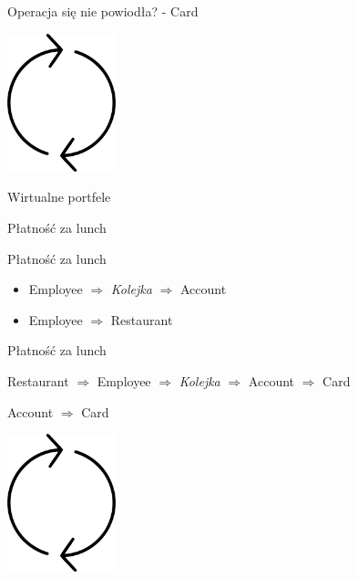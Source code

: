 \documentclass{beamer}
\begin{document}
\begin{frame}{Operacja się nie powiodła? - Card}
	\begin{center}
		\includegraphics[height=4cm]{cykl1.png}
	\end{center}
\end{frame}

\begin{frame}{Wirtualne portfele}
	\begin{center}
		\Huge{Płatność za lunch}
	\end{center}
\end{frame}

\begin{frame}{Płatność za lunch}
	\begin{huge}
		\begin{itemize}
			\item Employee $\Rightarrow$ \textit{Kolejka} $\Rightarrow$ Account
			\item Employee $\Rightarrow$ Restaurant
		\end{itemize}
	\end{huge}
\end{frame}

\begin{frame}{Płatność za lunch}
	\begin{center}
		\Huge{Restaurant $\Rightarrow$ Employee $\Rightarrow$ \textit{Kolejka} $\Rightarrow$ Account $\Rightarrow$ Card}
	\end{center}
\end{frame}

\begin{frame}{Account $\Rightarrow$ Card}
	\begin{center}
		\includegraphics[height=4cm]{cykl1.png}
	\end{center}
\end{frame}
\end{document}
